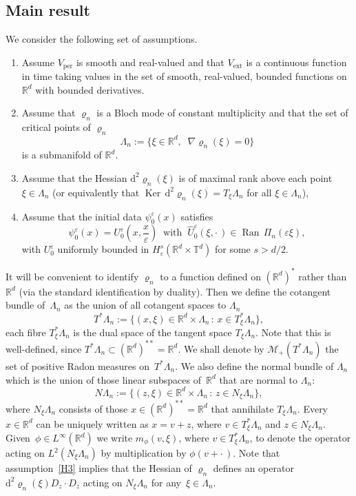\documentclass[10pt]{amsart}
\theoremstyle{definition}
\DeclareMathOperator{\ext}{ext}
\DeclareMathOperator{\per}{per}
\DeclareMathOperator{\Ran}{Ran}
\DeclareMathOperator{\Ker}{Ker}
\newcommand*\R{{\mathbb R}}
\newcommand*\T{{\mathbb T}}
\newcommand*\eps{\varepsilon}
\numberwithin{equation}{section}
\newcommand*{\Henumi}{\renewcommand*{\theenumi}{{H\arabic{enumi}}}}
\newcommand*{\dd}{\mathrm{d}}
\begin{document}
\subsection{Main result}
We consider the following set of assumptions.

\begin{enumerate}\Henumi
\item \label{H1} Assume $V_{\per}$ is smooth and real-valued and that $V_{\ext}$ is a continuous function in time taking values in the set of smooth, real-valued, bounded functions on~$\R^d$ with bounded derivatives.
\item \label{H2}Assume that $\varrho_n$ is a Bloch mode of constant multiplicity and that the set of critical points of $\varrho_n$
\[
\Lambda_n:=\{\xi\in\R^d,\;\; \nabla \varrho_n(\xi)=0\}
\]
is a submanifold of $\R^d$.
\item \label{H3}Assume that the Hessian $\dd^2 \varrho_n(\xi)$ is of maximal rank above each point $\xi\in\Lambda_n$ (or equivalently that ${\Ker} \, \dd^2 \varrho_n(\xi)= T_\xi \Lambda_n$ for all $\xi\in\Lambda_n$),
\item \label{H4}Assume that the initial data $\psi^\eps_0(x)$ satisfies
\[
\psi^\eps_0(x)= U^\eps_0\left(x,\frac{x}{\eps}\right)\;\; \text{with} \;\; \widehat U^\eps_0(\xi, \cdot\,)\in {\Ran} \,\Pi_n(\eps \xi),
\]
with $U^\eps_0$ uniformly bounded in $H^s_\eps(\R^d\times\T^d)$ for some $s>d/2$.
\end{enumerate}


It will be convenient to identify $\varrho_n$ to a function defined on $(\R^d)^*$ rather than $\R^d$ (via the standard identification by duality). Then we define the cotangent bundle of~$\Lambda_n$ as the union of all cotangent spaces to $\Lambda_n$
\begin{equation}\label{def:T*X}
T^*\Lambda_n:=\{(x,\xi)\in \R^d\times \Lambda_n \, : \, x \in T_\xi^* \Lambda_n \},
\end{equation}
each fibre $T_\xi^*\Lambda_n$ is the dual space of the tangent space $T_\xi\Lambda_n$. Note that this is well-defined, since $T^*\Lambda_n\subset (\R^d)^{**}=\R^d$. We shall denote by $\mathcal{M}_+(T^*\Lambda_n)$ the set of positive Radon measures on~$T^*\Lambda_n$. We also define the normal bundle of $\Lambda_n$ which is the union of those linear subspaces of~$\R^d$ that are normal to $\Lambda_n$:
\begin{equation}\label{def:NX}
N\Lambda_n:=\{(z,\xi)\in \R^d\times \Lambda_n \, : \, z \in N_\xi \Lambda_n \},
\end{equation}
where $N_\xi \Lambda_n$ consists of those $x\in(\R^d)^{**}=\R^d$ that annihilate $T_\xi \Lambda_n$. Every~$x\in\R^d$ can be uniquely written as $x=v+z$, where $v\in T^*_\xi\Lambda_n$ and $z\in N_\xi\Lambda_n$. Given~$\phi\in L^\infty(\R^d)$ we write $m_\phi(v,\xi)$, where $v\in T^*_\xi\Lambda_n$, to denote the operator acting on $L^2(N_\xi\Lambda_n)$ by multiplication by $\phi(v+\cdot\,)$. Note that assumption~\eqref{H3} implies that the Hessian of $\varrho_n$ defines an operator $\dd^2\varrho_n(\xi)D_z\cdot D_z$ acting on $N_\xi\Lambda_n$ for any~$\xi\in\Lambda_n$.
\end{document}
